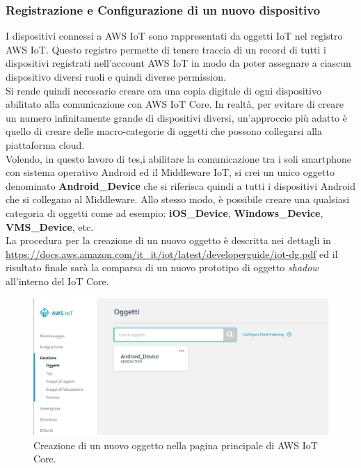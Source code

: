 \subsubsection{Registrazione e Configurazione di un nuovo dispositivo}
I dispositivi connessi a AWS IoT sono rappresentati da oggetti IoT nel registro AWS IoT. Questo registro permette di tenere traccia di un record di tutti i dispositivi registrati nell'account AWS IoT in modo da poter assegnare a ciascun dispositivo diversi ruoli e quindi diverse permission.\\
Si rende quindi necessario creare ora una copia digitale di ogni dispositivo abilitato alla comunicazione con AWS IoT Core. In realtà, per evitare di creare un numero infinitamente grande di dispositivi diversi, un'approccio più adatto è quello di creare delle macro-categorie di oggetti che possono collegarsi alla piattaforma cloud. \\
Volendo, in questo lavoro di tes,i abilitare la comunicazione tra i soli smartphone con sistema operativo Android ed il Middleware IoT, si crei un unico oggetto denominato \textbf{Android\_Device} che si riferisca quindi a tutti i dispositivi Android che si collegano al Middleware. Allo stesso modo, è possibile creare una qualsiasi categoria di oggetti come ad esempio: \textbf{iOS\_Device}, \textbf{Windows\_Device}, \textbf{VMS\_Device}, etc.\\
La procedura per la creazione di un nuovo oggetto è descritta nei dettagli in \url{https://docs.aws.amazon.com/it_it/iot/latest/developerguide/iot-dg.pdf} ed il risultato finale sarà la comparsa di un nuovo prototipo di oggetto \textit{shadow} all'interno del IoT Core.
\begin{figure}
	\begin{center}
		\includegraphics[width=0.9\columnwidth]{images/_2}
	\end{center}
	\caption{Creazione di un nuovo oggetto nella pagina principale di AWS IoT Core.}
	\label{fig:_2}
\end{figure}
